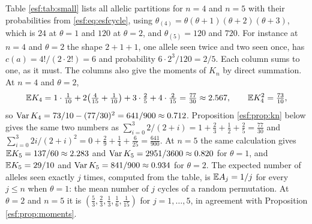 \begin{example}
\label{esf:ex:smalln}
Table \ref{esf:tab:small} lists all allelic partitions for $n = 4$ and $n = 5$ with
their probabilities from \eqref{esf:eq:esfcycle}, using
$\theta_{(4)} = \theta(\theta+1)(\theta+2)(\theta+3)$, which is $24$ at $\theta = 1$
and $120$ at $\theta = 2$, and $\theta_{(5)} = 120$ and $720$. For instance at
$n = 4$ and $\theta = 2$ the shape $2+1+1$, one allele seen twice and two seen once,
has $c(a) = 4!/(2 \cdot 2!) = 6$ and probability $6 \cdot 2^{3}/120 = 2/5$. Each column
sums to one, as it must. The columns also give the moments of $K_n$ by direct
summation. At $n = 4$ and $\theta = 2$,
\[
\mathbb{E} K_4 = 1 \cdot \tfrac{1}{10} + 2 \bigl( \tfrac{4}{15} + \tfrac{1}{10} \bigr)
+ 3 \cdot \tfrac{2}{5} + 4 \cdot \tfrac{2}{15} = \tfrac{77}{30} \approx 2.567,
\qquad
\mathbb{E} K_4^{2} = \tfrac{73}{10},
\]
so $\operatorname{Var} K_4 = 73/10 - (77/30)^2 = 641/900 \approx 0.712$. Proposition \ref{esf:prop:kn}
below gives the same two numbers as
$\sum_{i=0}^{3} 2/(2+i) = 1 + \tfrac23 + \tfrac12 + \tfrac25 = \tfrac{77}{30}$ and
$\sum_{i=0}^{3} 2i/(2+i)^{2} = 0 + \tfrac29 + \tfrac14 + \tfrac{6}{25} = \tfrac{641}{900}$.
At $n = 5$ the same calculation gives $\mathbb{E} K_5 = 137/60 \approx 2.283$ and
$\operatorname{Var} K_5 = 2951/3600 \approx 0.820$ for $\theta = 1$, and $\mathbb{E} K_5 = 29/10$ and
$\operatorname{Var} K_5 = 841/900 \approx 0.934$ for $\theta = 2$. The expected number of alleles
seen exactly $j$ times, computed from the table, is $\mathbb{E} A_j = 1/j$ for every $j \le n$
when $\theta = 1$: the mean number of $j$ cycles of a random permutation. At
$\theta = 2$ and $n = 5$ it is $(\tfrac53, \tfrac23, \tfrac13, \tfrac16, \tfrac{1}{15})$
for $j = 1, \dots, 5$, in agreement with Proposition \ref{esf:prop:moments}.
\end{example}

